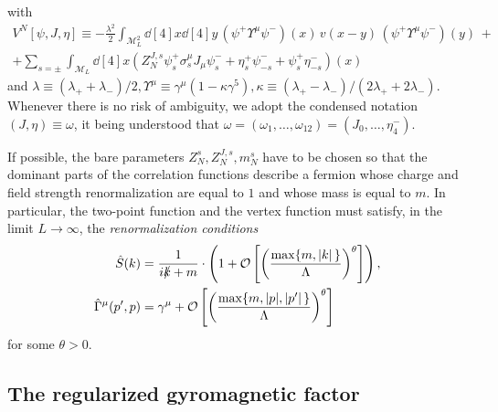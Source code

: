 \documentclass[a4paper, 11pt]{article}
\newcommand{\BigO}{\mathcal{O}}								%
\newcommand{\cutoff}{\Lambda}								%
\newcommand{\sing}[2]{{#1}^{#2}}							%
\newcommand{\src}{\omega}									%
\theoremstyle{thm}
\begin{document}
with
\begin{multline}
\label{eq:ultraviolet_fermionic_potential}
\sing{V}{N}[\psi, J, \eta] \equiv - \frac{\lambda^2}{2} \int_{\mathcal{M}_L^2} \dd[4]{x} \dd[4]{y} \, (\psi^+ \Upsilon^\mu \psi^-)(x) \, v(x - y) \, (\psi^+ \Upsilon^{\mu} \psi^-)(y) \, + \\
+ \sum_{s = \pm} \int_{\mathcal{M}_L} \dd[4]{x} (Z^{J, s}_N \psi^+_s \sigma^\mu_s J_\mu \psi^-_s + \eta^+_s \psi^-_{-s} + \psi^+_s \eta^-_{-s})(x)
\end{multline}
and $\lambda \equiv (\lambda_+ + \lambda_-)/2, \Upsilon^\mu \equiv \gamma^\mu(1 - \kappa \gamma^5),\kappa \equiv (\lambda_+ - \lambda_-)/(2\lambda_+ + 2\lambda_-)$.
Whenever there is no risk of ambiguity, we adopt the condensed notation $(J, \eta) \equiv \src$, it being understood that $\src = (\src_1, \dots, \src_{12}) = (J_0, \dots, \eta^-_4)$.

If possible, the bare parameters $Z^s_N, Z^{J, s}_N, m^s_N$ have to be chosen so that the dominant parts of the correlation functions describe a fermion whose charge and field strength renormalization are equal to $1$ and whose mass is equal to $m$. In particular, the two-point function and the vertex function must satisfy, in the limit $L\to\infty$, the \emph{renormalization conditions}
\begin{align} 
\label{eq:conditions_correlations}
\begin{split}
\hat{S}(k) 
& =\frac{1}{i \slashed{k}+m} \cdot \left( 1 + \BigO \left[ \left( \frac{\max \lbrace m, \abs*{k}\rbrace}{\cutoff} \right)^\theta \right] \right), \\ 
\hat{\Gamma}^\mu(p', p) 
& = \gamma^\mu + \BigO \left[ \left( \frac{\max \lbrace m, \abs{p}, \abs*{p'} \rbrace}{\cutoff} \right)^\theta \right]
\end{split}
\end{align} 
for some $\theta>0$. 

\subsection{The regularized gyromagnetic factor}
\label{subsec:model_definition1}
\end{document}
